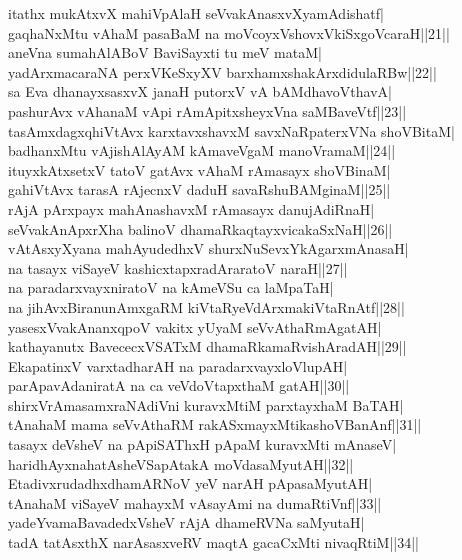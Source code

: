 \documentclass{article}
\begin{document}
itathx mukAtxvX mahiVpAlaH seVvakAnasxvXyamAdishatf|\\
gaqhaNxMtu vAhaM pasaBaM na moVcoyxVshovxVkiSxgoVcaraH||21||\\
aneVna sumahAlABoV BaviSayxti tu meV mataM|\\
yadArxmacaraNA perxVKeSxyXV barxhamxshakArxdidulaRBw||22||\\
sa Eva dhanayxsasxvX janaH putorxV vA bAMdhavoVthavA|\\
pashurAvx vAhanaM vApi rAmApitxsheyxVna saMBaveVtf||23||\\
tasAmxdagxqhiVtAvx karxtavxshavxM savxNaRpaterxVNa shoVBitaM|\\
badhanxMtu vAjishAlAyAM kAmaveVgaM manoVramaM||24||\\
ituyxkAtxsetxV tatoV gatAvx vAhaM rAmasayx shoVBinaM|\\
gahiVtAvx tarasA rAjecnxV daduH savaRshuBAMginaM||25||\\
rAjA pArxpayx mahAnashavxM rAmasayx danujAdiRnaH|\\
seVvakAnApxrXha balinoV dhamaRkaqtayxvicakaSxNaH||26||\\
vAtAsxyXyana mahAyudedhxV shurxNuSevxYkAgarxmAnasaH|\\
na tasayx viSayeV kashicxtapxradAraratoV naraH||27||\\
na paradarxvayxniratoV na kAmeVSu ca laMpaTaH|\\
na jihAvxBiranunAmxgaRM kiVtaRyeVdArxmakiVtaRnAtf||28||\\
yasesxVvakAnanxqpoV vakitx yUyaM seVvAthaRmAgatAH|\\
kathayanutx BavececxVSATxM dhamaRkamaRvishAradAH||29||\\
EkapatinxV varxtadharAH na paradarxvayxloVlupAH|\\
parApavAdaniratA na ca veVdoVtapxthaM gatAH||30||\\
shirxVrAmasamxraNAdiVni kuravxMtiM parxtayxhaM BaTAH|\\
tAnahaM mama seVvAthaRM rakASxmayxMtikashoVBanAnf||31||\\
tasayx deVsheV na pApiSAThxH pApaM kuravxMti mAnaseV|\\
haridhAyxnahatAsheVSapAtakA moVdasaMyutAH||32||\\
EtadivxrudadhxdhamARNoV yeV narAH pApasaMyutAH|\\
tAnahaM viSayeV mahayxM vAsayAmi na dumaRtiVnf||33||\\
yadeYvamaBavadedxVsheV rAjA dhameRVNa saMyutaH|\\
tadA tatAsxthX narAsasxveRV maqtA gacaCxMti nivaqRtiM||34||\\
\end{document}
